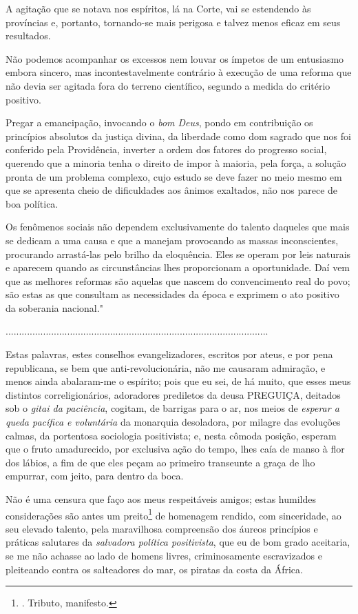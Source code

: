 A agitação que se notava nos espíritos, lá na Corte, vai se estendendo
às províncias e, portanto, tornando-se mais perigosa e talvez menos
eficaz em seus resultados.

Não podemos acompanhar os excessos nem louvar os ímpetos de um
entusiasmo embora sincero, mas incontestavelmente contrário à execução
de uma reforma que não devia ser agitada fora do terreno científico,
segundo a medida do critério positivo.

Pregar a emancipação, invocando o \emph{bom Deus}, pondo em contribuição
os princípios absolutos da justiça divina, da liberdade como dom sagrado
que nos foi conferido pela Providência, inverter a ordem dos fatores do
progresso social, querendo que a minoria tenha o direito de impor à
maioria, pela força, a solução pronta de um problema complexo, cujo
estudo se deve fazer no meio mesmo em que se apresenta cheio de
dificuldades aos ânimos exaltados, não nos parece de boa política.

Os fenômenos sociais não dependem exclusivamente do talento daqueles que
mais se dedicam a uma causa e que a manejam provocando as massas
inconscientes, procurando arrastá-las pelo brilho da eloquência. Eles se
operam por leis naturais e aparecem quando as circunstâncias lhes
proporcionam a oportunidade. Daí vem que as melhores reformas são
aquelas que nascem do convencimento real do povo; são estas as que
consultam as necessidades da época e exprimem o ato positivo da
soberania nacional."

..................................................................................................

Estas palavras, estes conselhos evangelizadores, escritos por ateus, e
por pena republicana, se bem que anti-revolucionária, não me causaram
admiração, e menos ainda abalaram-me o espírito; pois que eu sei, de há
muito, que esses meus distintos correligionários, adoradores prediletos
da deusa PREGUIÇA, deitados sob o \emph{gitai da paciência}, cogitam, de
barrigas para o ar, nos meios de \emph{esperar a queda pacífica e
voluntária} da monarquia desoladora, por milagre das evoluções calmas,
da portentosa sociologia positivista; e, nesta cômoda posição, esperam
que o fruto amadurecido, por exclusiva ação do tempo, lhes caía de manso
à flor dos lábios, a fim de que eles peçam ao primeiro transeunte a
graça de lho empurrar, com jeito, para dentro da boca.

Não é uma censura que faço aos meus respeitáveis amigos; estas humildes
considerações são antes um preito\footnote{. Tributo, manifesto.} de
homenagem rendido, com sinceridade, ao seu elevado talento, pela
maravilhosa compreensão dos áureos princípios e práticas salutares da
\emph{salvadora política positivista}, que eu de bom grado aceitaria, se
me não achasse ao lado de homens livres, criminosamente escravizados e
pleiteando contra os salteadores do mar, os piratas da costa da África.

